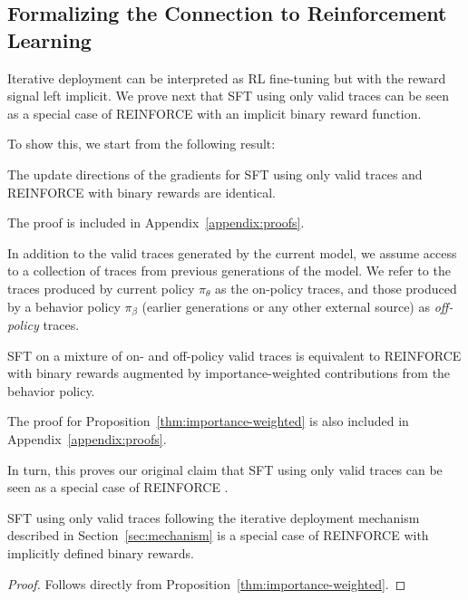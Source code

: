\subsection{Formalizing the Connection to Reinforcement Learning}
\label{sec:rl}

Iterative deployment can be interpreted as RL fine-tuning but with the reward
signal left implicit. We prove next that SFT using only valid traces can be seen
as a special case of REINFORCE \cite{williams-jml1992} with an implicit binary reward function.

To show this, we start from the following result:

\begin{proposition}
The update directions of the gradients for SFT using only
valid traces and REINFORCE with binary rewards are identical.
\label{thm:gradient-direction}
\end{proposition}

The proof is included in Appendix~\ref{appendix:proofs}.

In addition to the valid traces generated by the current model, we assume access
to a collection of traces from previous generations of the model. We refer to
the traces produced by current policy $\pi_\theta$ as the on-policy traces, and
those produced by a behavior policy $\pi_\beta$ (earlier generations or any
other external source) as \emph{off-policy} traces.

\begin{proposition}
SFT on a mixture of on- and off-policy valid traces is equivalent to REINFORCE
with binary rewards augmented by importance-weighted contributions from the
behavior policy.
\label{thm:importance-weighted}
\end{proposition}

The proof for Proposition~\ref{thm:importance-weighted} is also included in
Appendix~\ref{appendix:proofs}.

In turn, this proves our original claim that SFT
using only valid traces can be seen as a special case of REINFORCE
\cite{williams-jml1992}.

\begin{proposition}
SFT using only valid traces following the iterative deployment mechanism described in Section~\ref{sec:mechanism} is a special case of REINFORCE with implicitly defined binary rewards.
\label{thm:main-result}
\end{proposition}

\begin{proof}
Follows directly from Proposition~\ref{thm:importance-weighted}.
\end{proof}

